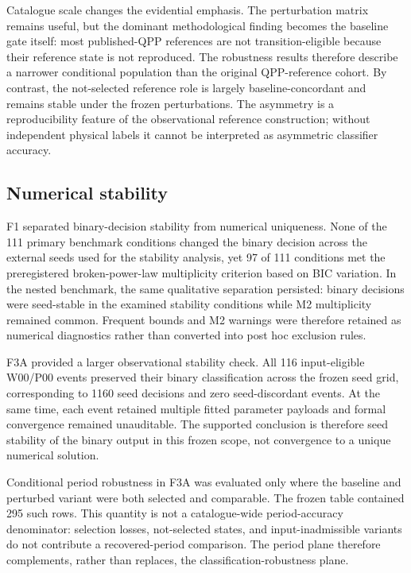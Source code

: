 \documentclass[11pt,a4paper]{article}
\begin{document}



Catalogue scale changes the evidential emphasis. The perturbation matrix remains useful, but the dominant methodological finding becomes the baseline gate itself: most published-QPP references are not transition-eligible because their reference state is not reproduced. The robustness results therefore describe a narrower conditional population than the original QPP-reference cohort. By contrast, the not-selected reference role is largely baseline-concordant and remains stable under the frozen perturbations. The asymmetry is a reproducibility feature of the observational reference construction; without independent physical labels it cannot be interpreted as asymmetric classifier accuracy.

\clearpage
\subsection{Numerical stability}
F1 separated binary-decision stability from numerical uniqueness. None of the 111 primary benchmark conditions changed the binary decision across the external seeds used for the stability analysis, yet 97 of 111 conditions met the preregistered broken-power-law multiplicity criterion based on BIC variation. In the nested benchmark, the same qualitative separation persisted: binary decisions were seed-stable in the examined stability conditions while M2 multiplicity remained common. Frequent bounds and M2 warnings were therefore retained as numerical diagnostics rather than converted into post hoc exclusion rules.

F3A provided a larger observational stability check. All 116 input-eligible W00/P00 events preserved their binary classification across the frozen seed grid, corresponding to 1160 seed decisions and zero seed-discordant events. At the same time, each event retained multiple fitted parameter payloads and formal convergence remained unauditable. The supported conclusion is therefore seed stability of the binary output in this frozen scope, not convergence to a unique numerical solution.

Conditional period robustness in F3A was evaluated only where the baseline and perturbed variant were both selected and comparable. The frozen table contained 295 such rows. This quantity is not a catalogue-wide period-accuracy denominator: selection losses, not-selected states, and input-inadmissible variants do not contribute a recovered-period comparison. The period plane therefore complements, rather than replaces, the classification-robustness plane.
\end{document}
